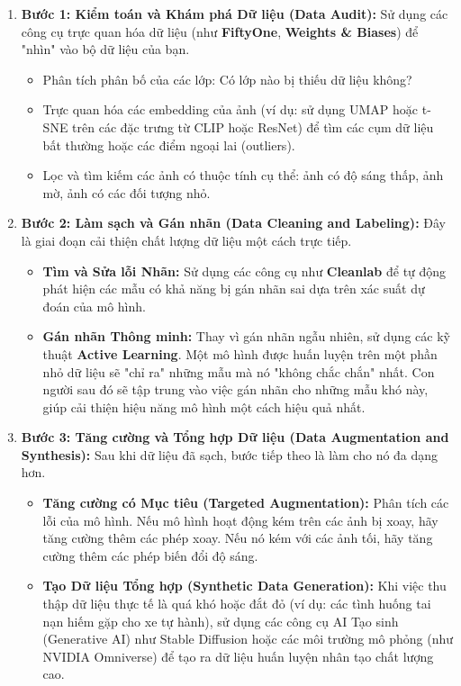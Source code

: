 \begin{enumerate}
	\item \textbf{Bước 1: Kiểm toán và Khám phá Dữ liệu (Data Audit):}
	Sử dụng các công cụ trực quan hóa dữ liệu (như \textbf{FiftyOne}, \textbf{Weights \& Biases}) để "nhìn" vào bộ dữ liệu của bạn.
	\begin{itemize}
		\item Phân tích phân bố của các lớp: Có lớp nào bị thiếu dữ liệu không?
		\item Trực quan hóa các embedding của ảnh (ví dụ: sử dụng UMAP hoặc t-SNE trên các đặc trưng từ CLIP hoặc ResNet) để tìm các cụm dữ liệu bất thường hoặc các điểm ngoại lai (outliers).
		\item Lọc và tìm kiếm các ảnh có thuộc tính cụ thể: ảnh có độ sáng thấp, ảnh mờ, ảnh có các đối tượng nhỏ.
	\end{itemize}
	
	\item \textbf{Bước 2: Làm sạch và Gán nhãn (Data Cleaning and Labeling):}
	Đây là giai đoạn cải thiện chất lượng dữ liệu một cách trực tiếp.
	\begin{itemize}
		\item \textbf{Tìm và Sửa lỗi Nhãn:} Sử dụng các công cụ như \textbf{Cleanlab} để tự động phát hiện các mẫu có khả năng bị gán nhãn sai dựa trên xác suất dự đoán của mô hình.
		\item \textbf{Gán nhãn Thông minh:} Thay vì gán nhãn ngẫu nhiên, sử dụng các kỹ thuật \textbf{Active Learning}. Một mô hình được huấn luyện trên một phần nhỏ dữ liệu sẽ "chỉ ra" những mẫu mà nó "không chắc chắn" nhất. Con người sau đó sẽ tập trung vào việc gán nhãn cho những mẫu khó này, giúp cải thiện hiệu năng mô hình một cách hiệu quả nhất.
	\end{itemize}
	
	\item \textbf{Bước 3: Tăng cường và Tổng hợp Dữ liệu (Data Augmentation and Synthesis):}
	Sau khi dữ liệu đã sạch, bước tiếp theo là làm cho nó đa dạng hơn.
	\begin{itemize}
		\item \textbf{Tăng cường có Mục tiêu (Targeted Augmentation):} Phân tích các lỗi của mô hình. Nếu mô hình hoạt động kém trên các ảnh bị xoay, hãy tăng cường thêm các phép xoay. Nếu nó kém với các ảnh tối, hãy tăng cường thêm các phép biến đổi độ sáng.
		\item \textbf{Tạo Dữ liệu Tổng hợp (Synthetic Data Generation):} Khi việc thu thập dữ liệu thực tế là quá khó hoặc đắt đỏ (ví dụ: các tình huống tai nạn hiếm gặp cho xe tự hành), sử dụng các công cụ AI Tạo sinh (Generative AI) như Stable Diffusion hoặc các môi trường mô phỏng (như NVIDIA Omniverse) để tạo ra dữ liệu huấn luyện nhân tạo chất lượng cao.
	\end{itemize}
	

\end{enumerate}
